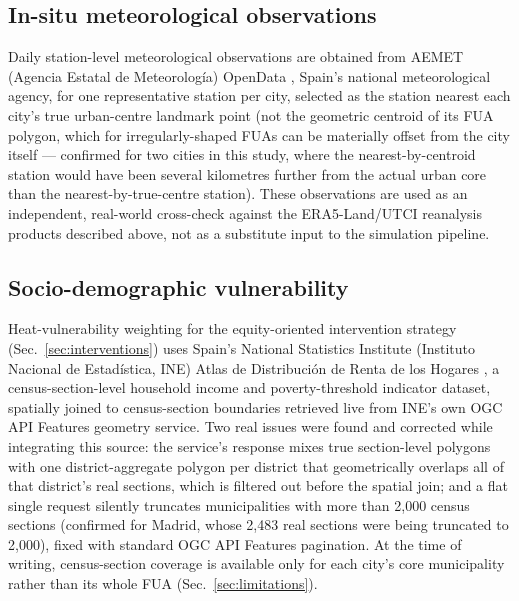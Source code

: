 \documentclass[pdflatex,sn-mathphys-ay]{sn-jnl}
\begin{document}
\subsection{In-situ meteorological observations}
\label{sec:aemet}

Daily station-level meteorological observations are obtained from AEMET
(Agencia Estatal de Meteorolog\'ia) OpenData \cite{aemet_opendata}, Spain's
national meteorological agency, for one representative station per city,
selected as the station nearest each city's true urban-centre landmark point
(not the geometric centroid of its FUA polygon, which for irregularly-shaped
FUAs can be materially offset from the city itself --- confirmed for two
cities in this study, where the nearest-by-centroid station would have been
several kilometres further from the actual urban core than the
nearest-by-true-centre station). These observations are used as an
independent, real-world cross-check against the ERA5-Land/UTCI reanalysis
products described above, not as a substitute input to the simulation
pipeline.

\subsection{Socio-demographic vulnerability}
\label{sec:vulnerability}

Heat-vulnerability weighting for the equity-oriented intervention strategy
(Sec.~\ref{sec:interventions}) uses Spain's National Statistics Institute
(Instituto Nacional de Estad\'istica, INE) Atlas de Distribuci\'on de Renta de
los Hogares \cite{ine_adrh}, a census-section-level household income and
poverty-threshold indicator dataset, spatially joined to census-section
boundaries retrieved live from INE's own OGC API Features geometry service.
Two real issues were found and corrected while integrating this source: the
service's response mixes true section-level polygons with one
district-aggregate polygon per district that geometrically overlaps all of
that district's real sections, which is filtered out before the spatial
join; and a flat single request silently truncates municipalities with more
than 2{,}000 census sections (confirmed for Madrid, whose 2{,}483 real
sections were being truncated to 2{,}000), fixed with standard OGC API
Features pagination. At the time of writing, census-section coverage is
available only for each city's core municipality rather than its whole FUA
(Sec.~\ref{sec:limitations}).
\end{document}
